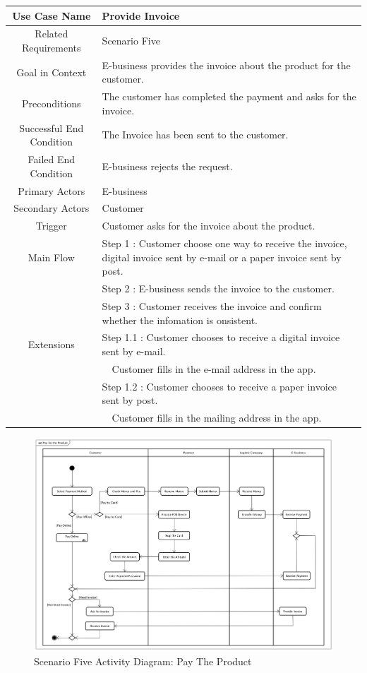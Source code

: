 \documentclass[12pt]{scrreprt}
\begin{document}
\begin{table}[H]
  \centering
  \begin{tabular}{| c | p{11cm} |}
    \hline
    Use Case Name & Provide Invoice\\
    \hline
    Related Requirements & Scenario Five\\
    \hline
    Goal in Context & E-business provides the invoice about the product for
    the customer.\\
    \hline
    Preconditions & The customer has completed the payment and asks for
    the invoice.\\
    \hline
    Successful End Condition & The Invoice has been sent to the customer.\\
    \hline
    Failed End Condition & E-business rejects the request.\\
    \hline
    Primary Actors & E-business\\
    \hline
    Secondary Actors & Customer\\
    \hline
    Trigger & Customer asks for the invoice about the product.\\
    \hline
    Main Flow & Step 1 : Customer choose one way to receive the invoice,
    digital invoice sent by e-mail or a paper invoice sent by post.\\
    & Step 2 : E-business sends the invoice to the customer.\\
    & Step 3 : Customer receives the invoice and confirm whether
    the infomation is onsistent.\\
    \hline
    Extensions & Step 1.1 : Customer chooses to receive a digital invoice
    sent by e-mail.\\
    & \ \ Customer fills in the e-mail address in the app.\\
    & Step 1.2 : Customer chooses to receive a paper invoice sent by post.\\
    & \ \ Customer fills in the mailing address in the app.\\
    \hline
  \end{tabular}
\end{table}

\begin{figure}[H]
  \centering\includegraphics[width=5in]{DocumentRes/5PayTheProduct.png}
  \caption{Scenario Five Activity Diagram: Pay The Product}
\end{figure}
\end{document}
